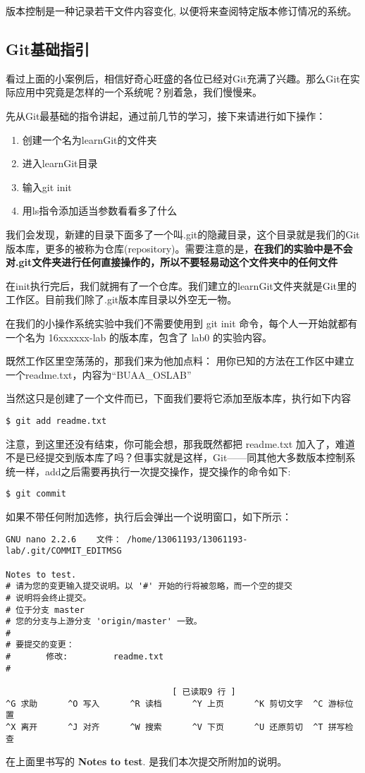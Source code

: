 \begin{note}
版本控制是一种记录若干文件内容变化, 以便将来查阅特定版本修订情况的系统。
\end{note}

\subsection{Git基础指引}
看过上面的小案例后，相信好奇心旺盛的各位已经对Git充满了兴趣。那么Git在实际应用中究竟是怎样的一个系统呢？别着急，我们慢慢来。

先从Git最基础的指令讲起，通过前几节的学习，接下来请进行如下操作：
\begin{enumerate}
    \item 创建一个名为learnGit的文件夹
    \item 进入learnGit目录
	\item 输入git init
	\item 用ls指令添加适当参数看看多了什么
\end{enumerate}
我们会发现，新建的目录下面多了一个叫.git的隐藏目录，这个目录就是我们的Git版本库，更多的被称为仓库(repository)。需要注意的是，\textbf{在我们的实验中是不会对.git文件夹进行任何直接操作的，所以不要轻易动这个文件夹中的任何文件}

在init执行完后，我们就拥有了一个仓库。我们建立的learnGit文件夹就是Git里的工作区。目前我们除了.git版本库目录以外空无一物。

\begin{note}
在我们的小操作系统实验中我们不需要使用到 git init 命令，每个人一开始就都有一个名为 16xxxxxx-lab 的版本库，包含了 lab0 的实验内容。
\end{note}

既然工作区里空荡荡的，那我们来为他加点料：
用你已知的方法在工作区中建立一个readme.txt，内容为“BUAA\_OSLAB”

当然这只是创建了一个文件而已，下面我们要将它添加至版本库，执行如下内容
\begin{verbatim}
$ git add readme.txt
\end{verbatim}
注意，到这里还没有结束，你可能会想，那我既然都把 readme.txt 加入了，难道不是已经提交到版本库了吗？但事实就是这样，Git——同其他大多数版本控制系统一样，add之后需要再执行一次提交操作，提交操作的命令如下:
\begin{verbatim}
$ git commit
\end{verbatim}
如果不带任何附加选修，执行后会弹出一个说明窗口，如下所示：
\begin{verbatim}
GNU nano 2.2.6    文件： /home/13061193/13061193-lab/.git/COMMIT_EDITMSG              

Notes to test.
# 请为您的变更输入提交说明。以 '#' 开始的行将被忽略，而一个空的提交
# 说明将会终止提交。
# 位于分支 master
# 您的分支与上游分支 'origin/master' 一致。
#
# 要提交的变更：
#       修改:         readme.txt
#

                                 [ 已读取9 行 ]
^G 求助      ^O 写入      ^R 读档      ^Y 上页      ^K 剪切文字  ^C 游标位置
^X 离开      ^J 对齐      ^W 搜索      ^V 下页      ^U 还原剪切  ^T 拼写检查
\end{verbatim}
在上面里书写的 \textbf{Notes to test}. 是我们本次提交所附加的说明。

